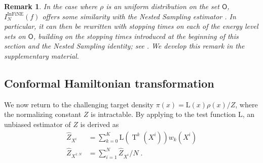 \documentclass{article}
\newtheorem{remark}{Remark}
\def\IFIS{\ensuremath{\operatorname{InFiNE}}}
\def\transfo{\operatorname{T}}
\def\rmd{\operatorname{d}\hspace{-2pt}}
\def\rmd{\mathrm{d}}
\def\eqsp{\,}
\def\ie{\textit{i.e.}}
\def\eqsp{\;}
\newcommand{\1}{\mathds{1}}
\def\const{Z}
\newcommand{\estConstC}[1]{\widehat{Z}_{#1}}
\newcommand{\hatpi}[1]{\hat{\pi}_{#1}}
\def\mso{\mathsf{O}}
\def\zset{\mathbb{Z}}
\def\rmd{\mathrm{d}}
\def\likelihood{\mathrm{L}}
\begin{document}
\begin{remark}\em
In the case where $\rho$ is an uniform distribution on the set $\mso$, $I^{\IFIS}_N(f)$ offers some similarity with the Nested Sampling estimator \cite{skilling2006nested}. In particular, it can then be rewritten with stopping times on each of the energy level sets on $\mso$, building on the stopping times introduced at the beginning of this section and the Nested Sampling identity; see \cite[Section 2]{chopin:robert:2010}. We develop this remark in the supplementary material.
\end{remark}

\subsection{Conformal Hamiltonian transformation}
\label{subsec:NISestimators}
We now return to the challenging target density $\pi(x)= \likelihood(x) \rho(x)/\const$,
where the normalizing constant $\const$ is intractable.
By applying  to
the test function $\likelihood$, an unbiased estimator of $\const$ is derived as
\begin{align}  \label{eq:def_estimator_normal_const_1}
  \estConstC{X^i}&=\sum\nolimits_{k=0}^K\likelihood(\transfo^{k}(X^i))w_k(X^i)\\
\label{eq:def_estimator_normal_const}  \estConstC{X^{1:N}}&=\sum\nolimits_{i=1}^{N} \hat{Z}_{X^i}\big/N \eqsp.
\end{align}

\end{document}
